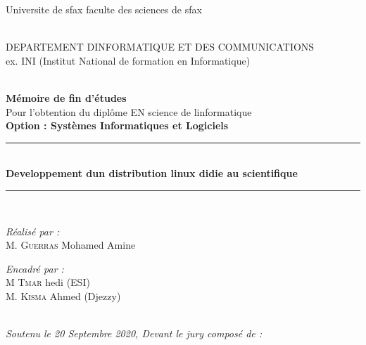 \begin{titlepage}
{\begin{minipage}{10cm}
\begin{flushright}
\begin{Arabic}
	Universite de sfax 
    faculte des sciences de sfax 
	\end{Arabic}\\
	{\small DEPARTEMENT DINFORMATIQUE ET DES COMMUNICATIONS}\\[0.1cm]
    {\small ex. INI (Institut National de formation en Informatique)}\\[0.1cm]
	\end{flushright}
\end{minipage}\hfill\\
\vspace{20mm}
{\large \bfseries Mémoire de fin d’études}\\[0.5cm]
{\large Pour l'obtention du diplôme  EN science de linformatique}\\[0.5cm]
{\large \bfseries{Option : Systèmes Informatiques et Logiciels} \\ }
\vspace{10mm}
\rule{\linewidth}{0.3mm} \\[0.4cm]
{ \huge \bfseries Developpement dun  distribution linux didie au scientifique\\[0.4cm] }
\rule{\linewidth}{0.3mm} \\[1cm]
\vspace{10mm}

\noindent
\begin{minipage}{0.5\textwidth}
    \vspace{-7mm}
  \begin{flushleft} \large
    \emph{Réalisé par :}\\
    M. \textsc{Guerras} Mohamed Amine \\
  \end{flushleft}
\end{minipage}
\begin{minipage}{0.4\textwidth}
  \begin{flushright} \large
    \begin{flushleft} \large
    \emph{Encadré par :} \\
    M \textsc{Tmar} hedi  (ESI)\\[0.1cm]
    M. \textsc{Kisma} Ahmed  (Djezzy)\\
    \end{flushleft}

  \end{flushright}
\end{minipage}\\[1cm]

{\large \textit{Soutenu le 20 Septembre 2020, Devant le jury composé de : }}\\[0.5cm]

}
\end{titlepage}
